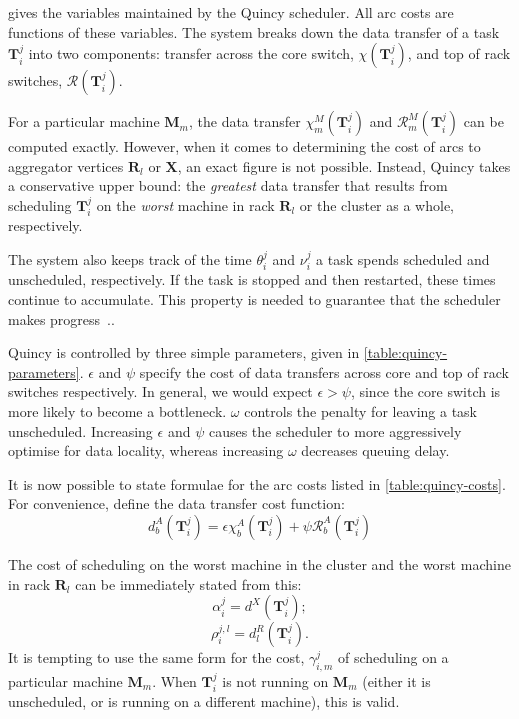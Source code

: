  gives the variables maintained by the Quincy scheduler. All arc costs are functions of these variables. The system breaks down the data transfer of a task $\mathbf{T}_{i}^{j}$ into two components: transfer across the core switch, $\chi\left(\mathbf{T}_{i}^{j}\right)$, and top of rack switches, $\mathcal{R}\left(\mathbf{T}_{i}^{j}\right)$.

For a particular machine $\mathbf{M}_m$, the data transfer $\chi_{m}^{M}\left(\mathbf{T}_{i}^{j}\right)$ and $\mathcal{R}_{m}^{M}\left(\mathbf{T}_{i}^{j}\right)$ can be computed exactly. However, when it comes to determining the cost of arcs to aggregator vertices $\mathbf{R}_l$ or $\mathbf{X}$, an exact figure is not possible. Instead, Quincy takes a conservative upper bound: the \emph{greatest} data transfer that results from scheduling $\mathbf{T}_{i}^{j}$ on the \emph{worst} machine in rack $\mathbf{R}_l$ or the cluster as a whole, respectively.

The system also keeps track of the time $\theta_i^j$ and $\nu_i^j$ a task spends scheduled and unscheduled, respectively. If the task is stopped and then restarted, these times continue to accumulate. This property is needed to guarantee that the scheduler makes progress~\cite[p.~19]{Isard:2009}..

Quincy is controlled by three simple parameters, given in \cref{table:quincy-parameters}. $\epsilon$ and $\psi$ specify the cost of data transfers across core and top of rack switches respectively. In general, we would expect $\epsilon > \psi$, since the core switch is more likely to become a bottleneck. $\omega$ controls the penalty for leaving a task unscheduled\footnotemark. Increasing $\epsilon$ and $\psi$ causes the scheduler to more aggressively optimise for data locality, whereas increasing $\omega$ decreases queuing delay.

It is now possible to state formulae for the arc costs listed in \cref{table:quincy-costs}. For convenience, define the data transfer cost function:
\[d_{b}^{A}\left(\mathbf{T}_{i}^{j}\right) = \epsilon\chi_{b}^{A}\left(\mathbf{T}_{i}^{j}\right)+\psi\mathcal{R}_{b}^{A}\left(\mathbf{T}_{i}^{j}\right)\]

The cost of scheduling on the worst machine in the cluster and the worst machine in rack $\mathbf{R}_l$ can be immediately stated from this:
\[\alpha_{i}^{j} = d^X\left(\mathbf{T}_{i}^{j}\right);\]
\[\rho_{i}^{j,l} = d^R_l\left(\mathbf{T}_{i}^{j}\right).\]
It is tempting to use the same form for the cost, $\gamma^j_{i,m}$ of scheduling on a particular machine $\mathbf{M}_m$. When $\mathbf{T}_{i}^{j}$ is not running on $\mathbf{M}_m$ (either it is unscheduled, or is running on a different machine), this is valid. 

